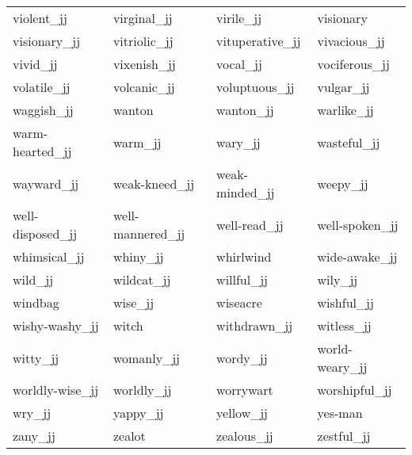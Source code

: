 \begin{longtable}[tbp]{| llll |}
   violent\_jj & virginal\_jj & virile\_jj & visionary \\
   visionary\_jj & vitriolic\_jj & vituperative\_jj & vivacious\_jj \\
   vivid\_jj & vixenish\_jj & vocal\_jj & vociferous\_jj \\
   volatile\_jj & volcanic\_jj & voluptuous\_jj & vulgar\_jj \\
   waggish\_jj & wanton & wanton\_jj & warlike\_jj \\
   warm-hearted\_jj & warm\_jj & wary\_jj & wasteful\_jj \\
   wayward\_jj & weak-kneed\_jj & weak-minded\_jj & weepy\_jj \\
   well-disposed\_jj & well-mannered\_jj & well-read\_jj & well-spoken\_jj \\
   whimsical\_jj & whiny\_jj & whirlwind & wide-awake\_jj \\
   wild\_jj & wildcat\_jj & willful\_jj & wily\_jj \\
   windbag & wise\_jj & wiseacre & wishful\_jj \\
   wishy-washy\_jj & witch & withdrawn\_jj & witless\_jj \\
   witty\_jj & womanly\_jj & wordy\_jj & world-weary\_jj \\
   worldly-wise\_jj & worldly\_jj & worrywart & worshipful\_jj \\
   wry\_jj & yappy\_jj & yellow\_jj & yes-man \\
   zany\_jj & zealot & zealous\_jj & zestful\_jj \\
    \hline
    
\end{longtable}
